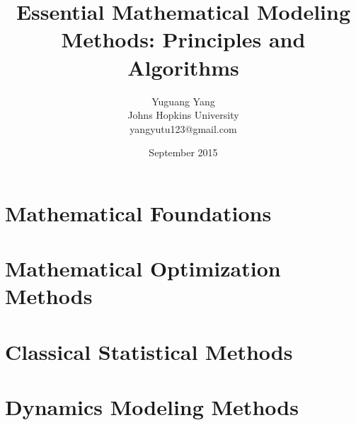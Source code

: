 \documentclass[oneside,hidelinks,12pt,letterpaper]{scrbook} %
\title{\huge \textbf{Essential Mathematical Modeling Methods: Principles and Algorithms}}
\author{Yuguang Yang \\
Johns Hopkins University \\yangyutu123@gmail.com }
\date{September 2015}
\theoremstyle{remark}
\theoremstyle{coloredRemark}
\theoremstyle{coloredNote}
\begin{document}
\sloppy



\hypersetup{colorlinks=false}

\newpage

\listofalgorithms
\listoffigures
\listoftables

\dominitoc
\tableofcontents 



\hypersetup{
	colorlinks=true,
	linkcolor=blue}

\mainmatter

\printnomenclature





\part{Mathematical Foundations}



\startcontents[chapters]

\part{Mathematical Optimization Methods}




\startcontents[chapters]
\part{Classical Statistical Methods}





\startcontents[chapters]
\part{Dynamics Modeling Methods}






\end{document}
